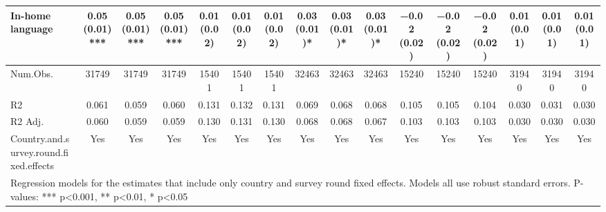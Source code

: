 \begin{table}
\begin{tabular}[t]{lccccccccccccccc}
In-home language & \num{0.05} (\num{0.01})*** & \num{0.05} (\num{0.01})*** & \num{0.05} (\num{0.01})*** & \num{0.01} (\num{0.02}) & \num{0.01} (\num{0.02}) & \num{0.01} (\num{0.02}) & \num{0.03} (\num{0.01})* & \num{0.03} (\num{0.01})* & \num{0.03} (\num{0.01})* & \num{-0.02} (\num{0.02}) & \num{-0.02} (\num{0.02}) & \num{-0.02} (\num{0.02}) & \num{0.01} (\num{0.01}) & \num{0.01} (\num{0.01}) & \num{0.01} (\num{0.01})\\
\midrule
Num.Obs. & \num{31749} & \num{31749} & \num{31749} & \num{15401} & \num{15401} & \num{15401} & \num{32463} & \num{32463} & \num{32463} & \num{15240} & \num{15240} & \num{15240} & \num{31940} & \num{31940} & \num{31940}\\
R2 & \num{0.061} & \num{0.059} & \num{0.060} & \num{0.131} & \num{0.132} & \num{0.131} & \num{0.069} & \num{0.068} & \num{0.068} & \num{0.105} & \num{0.105} & \num{0.104} & \num{0.030} & \num{0.031} & \num{0.030}\\
R2 Adj. & \num{0.060} & \num{0.059} & \num{0.059} & \num{0.130} & \num{0.131} & \num{0.130} & \num{0.068} & \num{0.068} & \num{0.067} & \num{0.103} & \num{0.103} & \num{0.103} & \num{0.030} & \num{0.030} & \num{0.030}\\
Country.and.survey.round.fixed.effects & Yes & Yes & Yes & Yes & Yes & Yes & Yes & Yes & Yes & Yes & Yes & Yes & Yes & Yes & Yes\\
\bottomrule
\multicolumn{16}{l}{\rule{0pt}{1em}Regression models for the estimates that include only country and survey round fixed effects. Models all use robust standard errors. P-values: *** p<0.001, ** p<0.01, * p<0.05}\\
\end{tabular}
\end{table}
